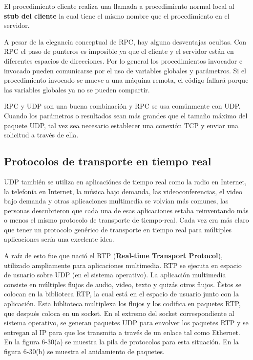 \documentclass[10pt,a4paper]{report}
\begin{document}
	\par El procedimiento cliente realiza una llamada a procedimiento normal local al \textbf{stub del cliente} la cual tiene el mismo nombre que el procedimiento en el servidor.
	
	\par A pesar de la elegancia conceptual de RPC, hay alguna desventajas ocultas. Con RPC el paso de punteros es imposible ya que el cliente y el servidor están en diferentes espacios de direcciones. Por lo general los procedimientos invocador e invocado pueden comunicarse por el uso de variables globales y parámetros. Si el procedimiento invocado se mueve a una máquina remota, el código fallará porque las variables globales ya no se pueden compartir.


	\par RPC y UDP son una buena combinación y RPC se usa comúnmente con UDP.  Cuando los parámetros o resultados sean más grandes que el tamaño máximo del paquete UDP, tal vez sea necesario establecer una conexión TCP y enviar una solicitud a través de ella.

\subsection{Protocolos de transporte en tiempo real}

	\par UDP también se utiliza en aplicaciónes de tiempo real como la radio en Internet, la telefonía en Internet, la música bajo demanda, las videoconferencias, el video bajo demanda y otras aplicaciones multimedia se volvían más comunes, las personas descubrieron que cada una de esas aplicaciones estaba reinventando más o menos el mismo protocolo de transporte de tiempo-real. Cada vez era más claro que tener un protocolo genérico de transporte en tiempo real para múltiples aplicaciones sería una excelente idea.

	\par A raíz de esto fue que nació el RTP (\textbf{Real-time Transport Protocol}), utilizado ampliamente para aplicaciones multimedia. RTP se ejecuta en espacio de usuario sobre UDP (en el sistema operativo). La aplicación multimedia consiste en múltiples flujos de audio, video, texto y quizás otros flujos. Éstos se colocan en la biblioteca RTP, la cual está en el espacio de usuario junto con la aplicación. Esta biblioteca multiplexa los flujos y los codifica en paquetes RTP, que después coloca en un socket. En el extremo del socket correspondiente al sistema operativo, se generan paquetes UDP para envolver los paquetes RTP y se entregan al IP para que los transmita a través de un enlace tal como Ethernet. En la figura 6-30(a) se muestra la pila de protocolos para esta situación. En la figura 6-30(b) se muestra el anidamiento de paquetes.
	
\end{document}
